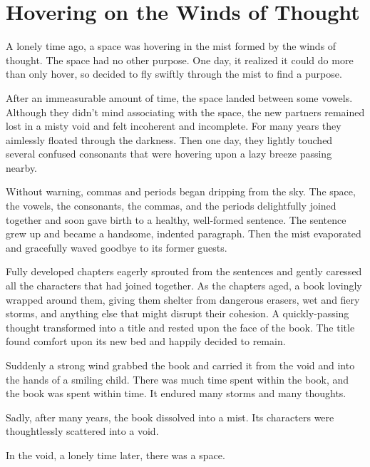 \chapter{Hovering on the Winds of Thought}
\setlength{\parindent}{2em}
\LARGE
{}\baselineskip

A lonely time ago, a space was hovering in the mist formed by the winds of thought. The space had no other purpose. One day, it realized it could do more than only hover, so decided to fly swiftly through the mist to find a purpose.

After an immeasurable amount of time, the space landed between some vowels. Although they didn't mind associating with the space, the new partners remained lost in a misty void and felt incoherent and incomplete. For many years they aimlessly floated through the darkness. Then one day, they lightly touched several confused consonants that were hovering upon a lazy breeze passing nearby.

Without warning, commas and periods began dripping from the sky. The space, the vowels, the consonants, the commas, and the periods delightfully joined together and soon gave birth to a healthy, well-formed sentence. The sentence grew up and became a handsome, indented paragraph. Then the mist evaporated and gracefully waved goodbye to its former guests.

Fully developed chapters eagerly sprouted from the sentences and gently caressed all the characters that had joined together. As the chapters aged, a book lovingly wrapped around them, giving them shelter from dangerous erasers, wet and fiery storms, and anything else that might disrupt their cohesion. A quickly-passing thought transformed into a title and rested upon the face of the book. The title found comfort upon its new bed and happily decided to remain.

Suddenly a strong wind grabbed the book and carried it from the void and into the hands of a smiling child. There was much time spent within the book, and the book was spent within time. It endured many storms and many thoughts.

Sadly, after many years, the book dissolved into a mist. Its characters were thoughtlessly scattered into a void.

In the void, a lonely time later, there was a space.
